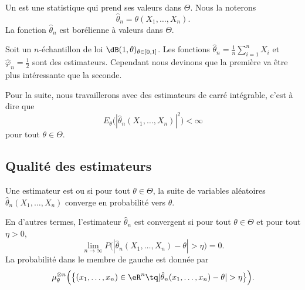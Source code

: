 Un  est une statistique qui prend ses valeurs dans \( \Theta\). Nous la noterons
\begin{equation}
    \hat\theta_n=\theta(X_1,\ldots,X_n).
\end{equation}
La fonction \( \hat\theta_n\) est borélienne à valeurs dans \( \Theta\).

\begin{example}
    Soit un \( n\)-échantillon de loi \( \dB(1,\theta)_{\theta\in\mathopen[ 0 , 1 \mathclose]}\). Les fonctions \( \hat\theta_n=\frac{1}{ n }\sum_{i=1}^nX_i\) et \( \hat\varphi_n=\frac{ 1 }{2}\) sont des estimateurs. Cependant nous devinons que la première va être plus intéressante que la seconde.
\end{example}

Pour la suite, nous travaillerons avec des estimateurs de carré intégrable, c'est à dire que
\begin{equation}
    E_{\theta}\big( | \hat\theta_n(X_1,\ldots,X_n) |^2 \big)<\infty
\end{equation}
pour tout \( \theta\in\Theta\).

\subsection{Qualité des estimateurs}

\begin{definition}
    Une estimateur est  ou  si pour tout \( \theta\in\Theta\), la suite de variables aléatoires \( \hat\theta_n(X_1,\ldots,X_n)\) converge en probabilité vers \( \theta\).
\end{definition}
En d'autres termes, l'estimateur \( \hat\theta_n\) est convergent si pour tout \( \theta\in\Theta\) et pour tout \( \eta>0\),
\begin{equation}
    \lim_{n\to \infty} P\big( | \hat\theta_n(X_1,\ldots,X_n)-\theta |>\eta \big)=0.
\end{equation}
La probabilité dans le membre de gauche est donnée par
\begin{equation}
    \mu^{\otimes n}_{\theta}\Big( \big\{ (x_1,\ldots,x_n)\in\eR^n\tq| \hat\theta_n(x_1,\ldots,x_n)-\theta |>\eta \big\} \Big).
\end{equation}


